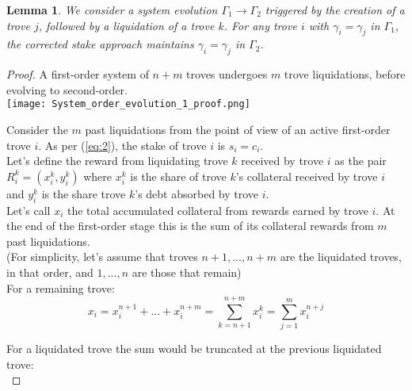 \documentclass[reqno]{article}
\newtheorem{lemma}[theorem]{Lemma}
\begin{document}

\begin{lemma}\label{result:1} We consider a system evolution $\Gamma_1 \rightarrow \Gamma_2$ triggered by the creation of a trove $j$, followed by a liquidation of a trove $k$. For any trove $i$ with $\gamma_i = \gamma_j$ in $\Gamma_1$, the corrected stake approach maintains $\gamma_i = \gamma_j$ in $\Gamma_2$.
\end{lemma}

\begin{proof}
A first-order system of $n+m$ troves undergoes $m$ trove liquidations, before evolving to second-order.\\

    \texttt{[image: System\_order\_evolution\_1\_proof.png]}

Consider the $m$ past liquidations from the point of view of an active first-order trove $i$. As per (\ref{eq:2}), the stake of trove $i$ is $s_i = c_i$.\\

Let’s define the reward from liquidating trove $k$ received by trove $i$ as the pair $R_i^k = (x_i^k, y_i^k)$ where $x_i^k$ is the share of trove $k$’s collateral received by trove $i$ and $y_i^k$ is the share trove $k$’s debt absorbed by trove $i$.\\

Let’s call $x_i$ the total accumulated collateral from rewards earned by trove $i$. At the end of the first-order stage this is the sum of its collateral rewards from $m$ past liquidations.\\

(For simplicity, let’s assume that troves $n+1, ..., n+m$ are the liquidated troves, in that order, and $1, ..., n$ are those that remain)\\

For a remaining trove:\\

\begin{equation} \label{eq:collreward}
  x_i = x_i^{n+1} + ... + x_i^{n+m} = \sum_{k=n+1}^{n+m}x_i^k = \sum_{j=1}^{m}x_i^{n+j}
\end{equation}

For a liquidated trove the sum would be truncated at the previous liquidated trove: \\


\end{proof}
\end{document}
